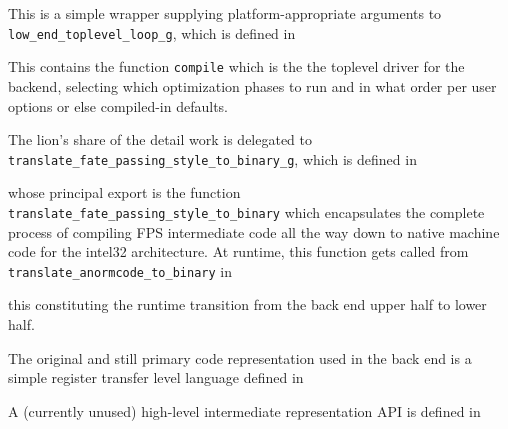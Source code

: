 This is a simple wrapper supplying platform-appropriate 
arguments to  {\tt low\_end\_toplevel\_loop\_g}, which is defined in

\begin{quote}
\end{quote}

This contains the function {\tt compile} which is the 
the toplevel driver for the backend, selecting 
which optimization phases to run and in what 
order per user options or else compiled-in defaults.

The lion's share of the detail work is delegated 
to {\tt translate\_fate\_passing\_style\_to\_binary\_g}, which is defined in

\begin{quote}
\end{quote}

whose principal export is the function  {\tt translate\_fate\_passing\_style\_to\_binary} 
which encapsulates the complete process of compiling 
FPS intermediate code all the way down to native machine 
code for the intel32 architecture.  At runtime, this function 
gets called from   {\tt translate\_anormcode\_to\_binary}   in

\begin{quote}
\end{quote}

this constituting the runtime transition from the 
back end upper half to lower half.

The original and still primary code representation used 
in the back end is a simple register transfer level 
language defined in

\begin{quote}
\end{quote}

A (currently unused) high-level intermediate representation API is defined in 

\begin{quote}
\end{quote}

